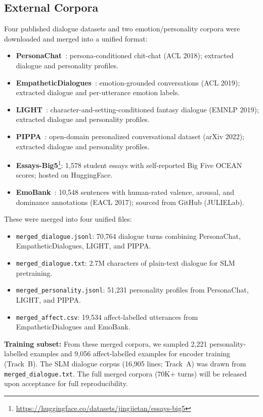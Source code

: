 \documentclass[11pt]{article}
\begin{document}
\subsection{External Corpora}

Four published dialogue datasets and two emotion/personality corpora were downloaded and merged into a unified format:

\begin{itemize}
    \item \textbf{PersonaChat}~\cite{zhang2018personalizing}: persona-conditioned chit-chat (ACL 2018); extracted dialogue and personality profiles.
    \item \textbf{EmpatheticDialogues}~\cite{rashkin2019empathetic}: emotion-grounded conversations (ACL 2019); extracted dialogue and per-utterance emotion labels.
    \item \textbf{LIGHT}~\cite{urbanek2019learning}: character-and-setting-conditioned fantasy dialogue (EMNLP 2019); extracted dialogue and personality profiles.
    \item \textbf{PIPPA}~\cite{gosmar2022pippa}: open-domain personalized conversational dataset (arXiv 2022); extracted dialogue and personality profiles.
    \item \textbf{Essays-Big5}\footnote{\url{https://huggingface.co/datasets/jingjietan/essays-big5}}: 1,578 student essays with self-reported Big Five OCEAN scores; hosted on HuggingFace.
    \item \textbf{EmoBank}~\cite{buechel2017emobank}: 10,548 sentences with human-rated valence, arousal, and dominance annotations (EACL 2017); sourced from GitHub (JULIELab).
\end{itemize}

These were merged into four unified files:
\begin{itemize}
    \item \texttt{merged\_dialogue.jsonl}: 70,764 dialogue turns combining PersonaChat, EmpatheticDialogues, LIGHT, and PIPPA.
    \item \texttt{merged\_dialogue.txt}: 2.7M characters of plain-text dialogue for SLM pretraining.
    \item \texttt{merged\_personality.jsonl}: 51,231 personality profiles from PersonaChat, LIGHT, and PIPPA.
    \item \texttt{merged\_affect.csv}: 19,534 affect-labelled utterances from EmpatheticDialogues and EmoBank.
\end{itemize}

\textbf{Training subset:} From these merged corpora, we sampled 2,221 personality-labelled examples and 9,056 affect-labelled examples for encoder training (Track~B).
The SLM dialogue corpus (16,905 lines; Track~A) was drawn from \texttt{merged\_dialogue.txt}.
The full merged corpora (70K+ turns) will be released upon acceptance for full reproducibility.
\end{document}
